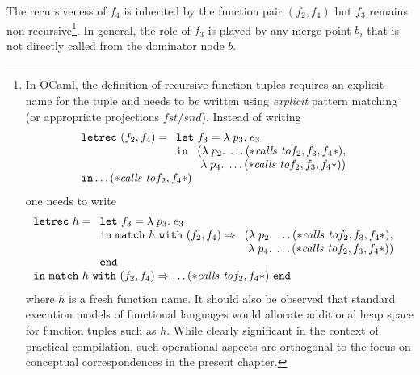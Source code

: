 The recursiveness of $f_4$ is inherited by the function pair
$(f_2,f_4)$ but $f_3$ remains non-recursive\footnote{In OCaml, the
definition of recursive function tuples requires an explicit name for
the tuple and needs to be written using \emph{explicit} pattern
matching (or appropriate projections
$\mathit{fst}/\mathit{snd}$). Instead of writing
$$\begin{array}{l}
     \mathtt{letrec}\ (f_2, f_4) =
     \begin{array}[t]{l}
              \mathtt{let}\ f_3 = \lambda\; p_3.\; e_3\\ \mathtt{in}\ 
              \begin{array}[t]{l}
                   (\lambda\; p_2.\; \ldots 
                       (*\mathit{calls\ to} f_2, f_3, f_4*),\\
                   \; \lambda\; p_4.\; \ldots 
                       (*\mathit{calls\ to} f_2, f_3, f_4*))
              \end{array}
           \end{array}\\
     \mathtt{in} \ldots (*\mathit{calls\ to} f_2, f_4*)
  \end{array}
$$
one needs to write
$$\begin{array}{l}
     \mathtt{letrec}\ h =
     \begin{array}[t]{l}
              \mathtt{let}\ f_3 = \lambda\; p_3.\; e_3\\
              \mathtt{in\ match}\ h\ \mathtt{with}\ (f_2,f_4) \Rightarrow 
              \begin{array}[t]{l}
                   (\lambda\; p_2.\; \ldots 
                       (*\mathit{calls\ to} f_2, f_3, f_4*),\\
                   \ \lambda\; p_4.\; \ldots 
                       (*\mathit{calls\ to} f_2, f_3, f_4*))
              \end{array}\\
              \mathtt{end}
           \end{array}\\
     \mathtt{in\ match}\ h\ \mathtt{with}\ (f_2,f_4) \Rightarrow
           \ldots (*\mathit{calls\ to} f_2, f_4*)\ \mathtt{end}
  \end{array}
$$
where $h$ is a fresh function name.  
It should also be observed that standard execution models of
functional languages would allocate additional heap space for function
tuples such as $h$. While clearly significant in the context of
practical compilation, such operational aspects are orthogonal to the
focus on conceptual correspondences in the present chapter.}.  In
general, the role of $f_3$ is played by any merge point $b_i$ that is
not directly called from the dominator node $b$.

